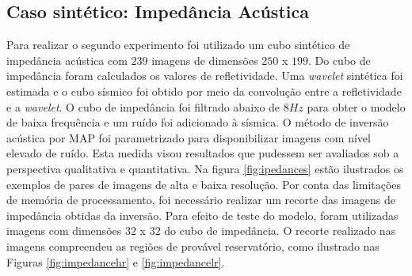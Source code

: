 \subsection{Caso sintético: Impedância Acústica}
Para realizar o segundo experimento foi utilizado um cubo sintético de impedância
acústica com $239$ imagens de dimensões $250$ x $199$. Do cubo de impedância foram calculados os
valores de refletividade. Uma \textit{wavelet}
sintética foi estimada e o cubo sísmico foi obtido por meio da
convolução entre a refletividade e a \textit{wavelet}. O cubo de impedância 
foi filtrado abaixo de $8Hz$ para obter o modelo de baixa frequência e
um ruído foi adicionado à sísmica. O método de inversão acústica por MAP
foi parametrizado para disponibilizar imagens com nível elevado de ruído.
Esta medida visou resultados que pudessem ser avaliados sob a perspectiva qualitativa e quantitativa.
Na figura \ref{fig:ipedances} estão ilustrados os exemplos de pares de imagens de alta e baixa resolução.
Por conta das limitações de memória de processamento, foi necessário realizar um recorte das imagens de impedância
obtidas da inversão. Para efeito de teste do modelo, foram utilizadas imagens com dimensões $32$ x $32$ do cubo de impedância.
O recorte realizado nas imagens compreendeu as regiões de provável reservatório, como ilustrado nas Figuras \ref{fig:impedancehr}
e \ref{fig:impedancelr}.

